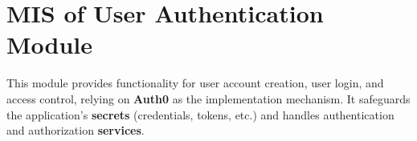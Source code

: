 \documentclass[12pt, titlepage]{article}
\begin{document}








\section{MIS of User Authentication Module} \label{AuthModule}

This module provides functionality for user account creation, user login, and
access control, relying on \textbf{Auth0} as the implementation mechanism. It
safeguards the application's \textbf{secrets} (credentials, tokens, etc.) and
handles authentication and authorization \textbf{services}.
\end{document}
